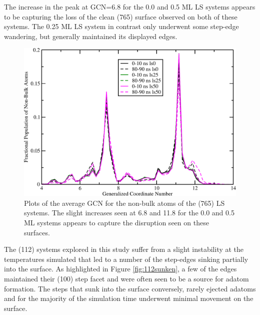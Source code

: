 The increase in the peak at GCN=6.8 for the 0.0 and 0.5 ML LS systems appears
to be capturing the loss of the clean (765) surface observed on both of these
systems. The 0.25 ML LS system in contrast only underwent some step-edge
wandering, but generally maintained its displayed edges.

\begin{figure}
\centering
\includegraphics[width=0.9\linewidth]{../figures/appB/765ls_GCNF.pdf}
\caption{Plots of the average GCN for the non-bulk atoms of the  (765)
LS systems. The slight increases seen at 6.8 and 11.8 for the 0.0 and 0.5 ML
systems appears to capture the disruption seen on these surfaces.}
\label{fig:765lsGCN}
\end{figure}
\newpage

The (112) systems explored in this study suffer from a slight instability at
the temperatures simulated that led to a number of the step-edges sinking
partially into the surface. As highlighted in Figure \ref{fig:112sunken}, a few
of the edges maintained their (100) step facet and were often seen to be a
source for adatom formation. The steps that sunk into the surface conversely,
rarely ejected adatoms and for the majority of the simulation time underwent
minimal movement on the surface.

